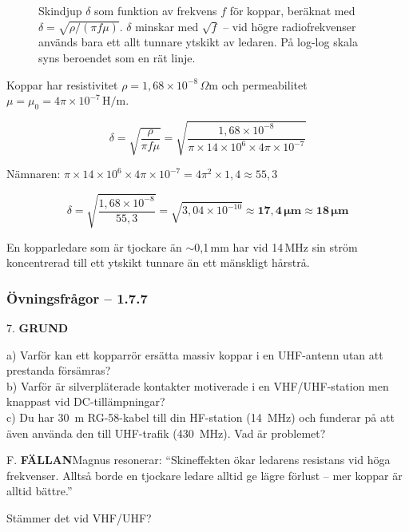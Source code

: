 \documentclass[a4paper,11pt,twoside]{book}
\newcommand{\qgrund}{\colorbox{greenpale}{\textcolor{greendark}{\headingfont\bfseries\tiny GRUND}}}
\newcommand{\qfallan}{\colorbox{ljusbrun}{\textcolor{kakao}{\headingfont\bfseries\tiny FÄLLAN}}}
\begin{document}
\begin{figure}[htbp]
\caption{Skindjup $\delta$ som funktion av frekvens $f$ för koppar,
beräknat med $\delta = \sqrt{\rho/(\pi f \mu)}$.
$\delta$ minskar med $\sqrt{f}$ -- vid högre radiofrekvenser
används bara ett allt tunnare ytskikt av ledaren.
På log-log skala syns beroendet som en rät linje.}
\label{fig:skineffekt}
\end{figure}

\begin{worked}[title={Räkneexempel 1.7.7 -- Skindjup i koppar vid 14\,MHz}]
Koppar har resistivitet $\rho = 1{,}68 \times 10^{-8}\,\Omega\text{m}$
och permeabilitet $\mu = \mu_0 = 4\pi \times 10^{-7}\,\text{H/m}$.

\[ \delta = \sqrt{\frac{\rho}{\pi f \mu}}
   = \sqrt{\frac{1{,}68 \times 10^{-8}}{\pi \times 14 \times 10^6
     \times 4\pi \times 10^{-7}}} \]

Nämnaren: $\pi \times 14 \times 10^6 \times 4\pi \times 10^{-7}
= 4\pi^2 \times 1{,}4 \approx 55{,}3$

\[ \delta = \sqrt{\frac{1{,}68 \times 10^{-8}}{55{,}3}}
   = \sqrt{3{,}04 \times 10^{-10}} \approx \mathbf{17{,}4\,\mu\text{m} \approx 18\,\mu\text{m}} \]

En kopparledare som är tjockare än $\sim$0,1\,mm har
vid 14\,MHz sin ström koncentrerad till
ett ytskikt tunnare än ett mänskligt hårstrå.
\end{worked}

\subsubsection*{Övningsfrågor -- 1.7.7}

\begin{qblock}{7.}
\qgrund\quad

a) Varför kan ett kopparrör ersätta massiv koppar
i en UHF-antenn utan att prestanda försämras?\\
b) Varför är silverpläterade kontakter motiverade
i en VHF/UHF-station men knappast vid DC-tillämpningar?\\
c) Du har 30~m RG-58-kabel till din
HF-station (14~MHz) och funderar på att även
använda den till UHF-trafik (430~MHz).
Vad är problemet?
\end{qblock}

\begin{qblock}{F.}
\qfallan\quad Magnus resonerar: ``Skineffekten
ökar ledarens resistans vid höga frekvenser.
Alltså borde en tjockare ledare alltid ge
lägre förlust -- mer koppar är alltid bättre.''

Stämmer det vid VHF/UHF?
\end{qblock}
\end{document}
